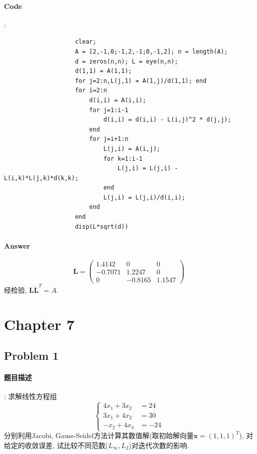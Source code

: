 \documentclass{article}
\begin{document}
\begin{CJK*}{UTF8}{song}
			\paragraph{Code}:\newline
				\begin{lstlisting}
					clear;
					A = [2,-1,0;-1,2,-1;0,-1,2]; n = length(A);
					d = zeros(n,n); L = eye(n,n);
					d(1,1) = A(1,1);
					for j=2:n,L(j,1) = A(1,j)/d(1,1); end
					for i=2:n
						d(i,i) = A(i,i);
						for j=1:i-1
							d(i,i) = d(i,i) - L(i,j)^2 * d(j,j);
						end
						for j=i+1:n
							L(j,i) = A(i,j);
							for k=1:i-1
								L(j,i) = L(j,i) - L(i,k)*L(j,k)*d(k,k);
							end
							L(j,i) = L(j,i)/d(i,i);
						end
					end
					disp(L*sqrt(d))
				\end{lstlisting}
			\paragraph{Answer}
			
				$$\mathbf{\overline{L}} = \left(
					\begin{matrix}
						1.4142     &    0      &   0\\
						-0.7071 &   1.2247    &     0\\
						0  & -0.8165  &  1.1547
					\end{matrix}
				\right)$$
				经检验, $\mathbf{\overline{LL}}^T = A$.
	\section{Chapter 7}
		\subsection{Problem 1}
			\paragraph{题目描述}
			:\newline
				求解线性方程组
				$$\left\{
				\begin{aligned}
					4x_1 + 3x_2 &=24 \\
					3x_1 + 4x_2 &=30 \\
					-x_2 + 4x_3 &=-24
				\end{aligned}
				\right.$$
				分别利用Jacobi, Gauss-Seidel方法计算其数值解(取初始解向量$\mathbf{x}=\left(1,1,1\right)^T$), 对给定的收敛误差, 试比较不同范数($L_{\infty},L_2$)对迭代次数的影响.

\end{CJK*}
\end{document}
